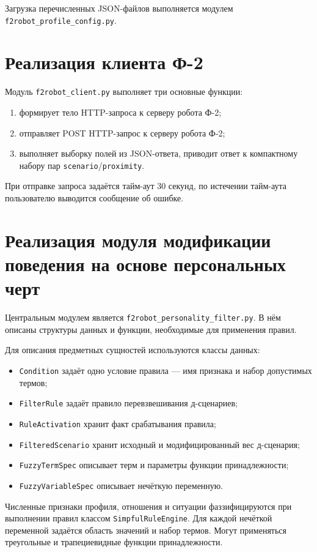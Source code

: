 Загрузка перечисленных JSON-файлов выполняется модулем
\texttt{f2robot\_profile\_config.py}.

\section{Реализация клиента Ф-2}

Модуль \texttt{f2robot\_client.py} выполняет три основные функции:

\begin{enumerate}
	\item формирует тело HTTP-запроса к серверу робота Ф-2;
	\item отправляет POST HTTP-запрос к серверу робота Ф-2;
	\item выполняет выборку полей из JSON-ответа, приводит ответ к компактному набору пар
	\texttt{scenario}/\texttt{proximity}.
\end{enumerate}

При отправке запроса задаётся тайм-аут 30 секунд, по истечении тайм-аута пользователю выводится сообщение об ошибке.

\section{Реализация модуля модификации поведения на основе персональных черт}

Центральным модулем является \texttt{f2robot\_personality\_filter.py}.
В нём описаны структуры данных и функции, необходимые для применения правил.

Для описания предметных сущностей используются классы данных:

\begin{itemize}
	\item \texttt{Condition} задаёт одно условие правила --- имя признака и набор
	допустимых термов;
	\item \texttt{FilterRule} задаёт правило перевзвешивания д-сценариев;
	\item \texttt{RuleActivation} хранит факт срабатывания правила;
	\item \texttt{FilteredScenario} хранит исходный и модифицированный вес
	д-сценария;
	\item \texttt{FuzzyTermSpec} описывает терм и параметры функции
	принадлежности;
	\item \texttt{FuzzyVariableSpec} описывает нечёткую переменную.
\end{itemize}

Численные признаки профиля, отношения и ситуации фаззифицируются при выполнении
правил классом \texttt{SimpfulRuleEngine}.
Для каждой нечёткой переменной задаётся область значений и набор термов.
Могут применяться треугольные и трапециевидные функции принадлежности.

